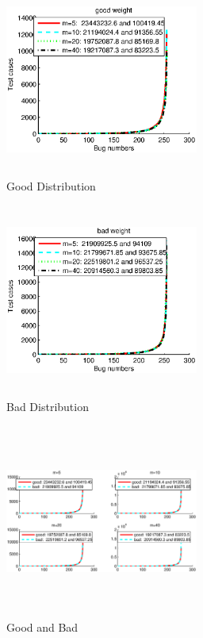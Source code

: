 \documentclass[10pt,journal,letterpaper,compsoc]{IEEEtran}
\begin{document}
\begin{CJK}{UTF8}{gkai}
 \begin{figure}[htb]
   \centering
   \includegraphics[width=2.5in,height=2.5in]{./a1_picture/good.eps}
   \caption{Good Distribution}
   \label{fig:ARCH}
 \end{figure}
 \begin{figure}[htb]
   \centering
   \includegraphics[width=2.5in,height=2.5in]{./a1_picture/bad.eps}
   \caption{Bad Distribution}
   \label{fig:ARCH}
 \end{figure}
 \begin{figure}[htb]
   \centering
   \includegraphics[width=2.5in,height=2.5in]{./a1_picture/good_and_bad.eps}
   \caption{Good and Bad}
   \label{fig:ARCH}
 \end{figure}


\end{CJK}
\end{document}
